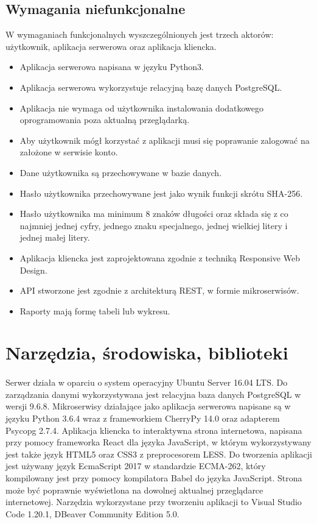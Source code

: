 \documentclass{article}
\begin{document}
	\subsection{Wymagania niefunkcjonalne}
	W wymaganiach funkcjonalnych wyszczególnionych jest trzech aktorów: użytkownik, aplikacja serwerowa oraz aplikacja kliencka.
	\begin{itemize}
		\item Aplikacja serwerowa napisana w języku Python3.
		\item Aplikacja serwerowa wykorzystuje relacyjną bazę danych PostgreSQL.
		\item Aplikacja nie wymaga od użytkownika instalowania dodatkowego oprogramowania poza aktualną przeglądarką.
		\item Aby użytkownik mógł korzystać z aplikacji musi się poprawanie zalogować na założone w serwisie konto.
		\item Dane użytkownika są przechowywane w bazie danych.
		\item Hasło użytkownika przechowywane jest jako wynik funkcji skrótu SHA-256.
		\item Hasło użytkownika ma minimum 8 znaków długości oraz składa się z co najmniej jednej cyfry, jednego znaku specjalnego, jednej wielkiej litery i jednej małej litery.
		\item Aplikacja kliencka jest zaprojektowana zgodnie z techniką Responsive Web Design.
		\item API stworzone jest zgodnie z architekturą REST, w formie mikroserwisów.
		\item Raporty mają formę tabeli lub wykresu.
	\end{itemize}
	\section{Narzędzia, środowiska, biblioteki}
	\paragraph{}Serwer działa w oparciu o system operacyjny Ubuntu Server 16.04 LTS.
	Do zarządzania danymi wykorzystywana jest relacyjna baza danych PostgreSQL w wersji 9.6.8.
	Mikroserwisy działające jako aplikacja serwerowa napisane są w języku Python 3.6.4 wraz z frameworkiem CherryPy 14.0 oraz adapterem Psycopg 2.7.4.
	Aplikacja kliencka to interaktywna strona internetowa, napisana przy pomocy frameworka React dla języka JavaScript, w którym wykorzystywany jest także język HTML5 oraz CSS3 z preprocesorem LESS. Do tworzenia aplikacji jest używany język EcmaScript 2017 w standardzie ECMA-262, który kompilowany jest przy pomocy kompilatora Babel do języka JavaScript. Strona może być poprawnie wyświetlona na dowolnej aktualnej przeglądarce internetowej.
	Narzędzia wykorzystane przy tworzeniu aplikacji to Visual Studio Code 1.20.1, DBeaver Community Edition 5.0.
\end{document}
